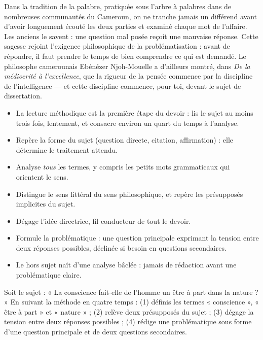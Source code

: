 \documentclass[11pt]{article}
\begin{document}
\begin{savaistu}
Dans la tradition de la palabre, pratiquée sous l'arbre à palabres dans de nombreuses communautés du Cameroun, on ne tranche jamais un différend avant d'avoir longuement écouté les deux parties et examiné chaque mot de l'affaire. Les anciens le savent : une question mal posée reçoit une mauvaise réponse. Cette sagesse rejoint l'exigence philosophique de la problématisation : avant de répondre, il faut prendre le temps de bien comprendre ce qui est demandé. Le philosophe camerounais Ebénézer Njoh-Mouelle a d'ailleurs montré, dans \emph{De la médiocrité à l'excellence}, que la rigueur de la pensée commence par la discipline de l'intelligence — et cette discipline commence, pour toi, devant le sujet de dissertation.
\end{savaistu}

\begin{aretenir}
\begin{itemize}
\item La lecture méthodique est la première étape du devoir : lis le sujet au moins trois fois, lentement, et consacre environ un quart du temps à l'analyse.
\item Repère la forme du sujet (question directe, citation, affirmation) : elle détermine le traitement attendu.
\item Analyse \emph{tous} les termes, y compris les petits mots grammaticaux qui orientent le sens.
\item Distingue le sens littéral du sens philosophique, et repère les présupposés implicites du sujet.
\item Dégage l'idée directrice, fil conducteur de tout le devoir.
\item Formule la problématique : une question principale exprimant la tension entre deux réponses possibles, déclinée si besoin en questions secondaires.
\item Le hors sujet naît d'une analyse bâclée : jamais de rédaction avant une problématique claire.
\end{itemize}
\end{aretenir}

\begin{exercice}
Soit le sujet : « La conscience fait-elle de l'homme un être à part dans la nature ? » En suivant la méthode en quatre temps : (1) définis les termes « conscience », « être à part » et « nature » ; (2) relève deux présupposés du sujet ; (3) dégage la tension entre deux réponses possibles ; (4) rédige une problématique sous forme d'une question principale et de deux questions secondaires.
\end{exercice}
\end{document}
